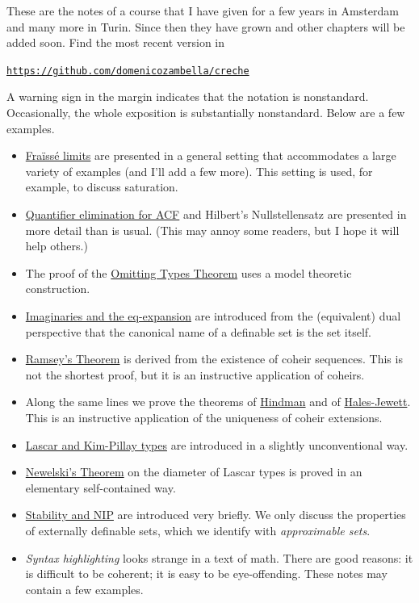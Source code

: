 \documentclass[creche.tex]{subfiles}
\begin{document}
These are the notes of a course that I have given for a few years in Amsterdam and many more in Turin.
Since then they have grown and other chapters will be added soon.
Find the most recent version in 

\hfil\href{https://github.com/domenicozambella/creche}{\tt https://github.com/domenicozambella/creche}


\noindent\llap{\textcolor{red}{\Large\danger}\kern1.5ex}A warning sign in the margin indicates that the notation is nonstandard.
Occasionally, the whole exposition is substantially nonstandard.
Below are a few examples.



\begin{itemize}
\item \hyperref[rich]{Fraïssé limits} are presented in a general setting that accommodates a large variety of examples (and I'll add a few more).
This setting is used, for example, to discuss saturation.
\item \hyperref[algebraic]{Quantifier elimination for ACF} and Hilbert's Nullstellensatz are presented in more detail than is usual.
(This may annoy some readers, but I hope it will help others.)
\item The proof of the \hyperref[countable]{Omitting Types Theorem} uses a model theoretic construction.
\item \hyperref[imaginary]{Imaginaries and the eq-expansion} are introduced from the (equivalent) dual perspective that the canonical name of a definable set is the set itself.
\item \hyperref[Ramsey]{Ramsey's Theorem} is derived from the existence of coheir sequences.
This is not the shortest proof, but it is an instructive application of coheirs.
\item Along the same lines we prove the theorems of \hyperref[Hindman]{Hindman} and of \hyperref[HJ]{Hales-Jewett}. This is an instructive application of the uniqueness of coheir extensions.
\item \hyperref[invariantL]{Lascar and Kim-Pillay types} are introduced in a slightly unconventional way.
\item \hyperref[newelski]{Newelski's Theorem\/} on the diameter of Lascar types is proved in an elementary self-contained way.
\item  \hyperref[external]{Stability and NIP\/} are introduced very briefly.
We only discuss the properties of externally definable sets, which we identify with \textit{approximable sets}.
\item \noindent\emph{Syntax highlighting\/} looks strange in a text of math. There are good reasons: it is difficult to be {\gr coherent}; it is easy to be {\mr eye-o}{\gr ffend}{\mr ing}. These notes may contain a few examples. 
\end{itemize}
\end{document}
